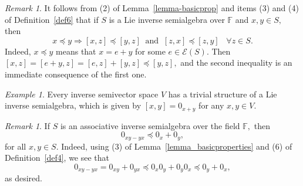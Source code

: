 \documentclass{amsart}
\newcommand{\E}{\mathcal{E}}
\newcommand{\0}{{\vartheta}}
\theoremstyle{definition}
\theoremstyle{remark}
\newtheorem{rem}[thm]{Remark}
\newtheorem{ex}[thm]{Example}
\numberwithin{equation}{section}
\newtheorem*{Theorem A}{\textbf{Theorem A}}
\newtheorem*{Corollary E}{\textbf{Corollary E}}
\newtheorem*{Corollary F}{\textbf{Corollary F}}
\newtheorem*{Theorem B}{\textbf{Theorem B}}
\newtheorem*{Theorem C}{\textbf{Theorem C}}
\newtheorem*{Theorem D}{\textbf{Theorem B}}
\newtheorem*{p a}{\textbf{Proof of  Theorem A}}
\newtheorem*{p b}{\textbf{Proof of Theorem B}}
\newtheorem*{p c}{\textbf{Proof of  Theorem C}}
\newtheorem*{p d}{\textbf{Proof of  Theorem D}}
\begin{document}
\begin{rem} It  follows from (2) of Lemma~\ref{lemma-basicprop} and items (3) and (4) of  Definition~\ref{def6} that if $S$ is a  Lie inverse semialgebra over  $\mathbb{F}$ and $x,y \in S,$  then 
\begin{equation}\label{eq:ineq}
x \preceq  y \Rightarrow [x,z] \preceq [y,z]\;\;\text{and}\;\;  [z,x] \preceq [z,y]\;\;\; \forall z\in S.
\end{equation} Indeed, $x \preceq y$ means that $x= e+ y$ for some $e\in \E (S).$ Then $[x,z] = [e+y,z] = [e,z]+
[y,z] \preceq [y,z],$ and the second inequality is an
immediate  consequence of the first one.
\end{rem}


\begin{ex}
Every inverse semivector space $V$ has a trivial structure of a Lie inverse semialgebra, which is given by $[x,y]=0_{x+y}$ for any $x,y\in V$. 
\end{ex}


\begin{rem}\label{rem:InvAssocLieInequality} 
    If  $S$ is an  associative inverse semialgebra over the field
      $\mathbb{F},$ then
\begin{equation}\label{eq:InvAssocLieInequality}   
    0_{xy -yx} \preceq 0_x + 0_y,
\end{equation}  for all $x,y \in S.$ Indeed, using  (3) of  Lemma~\ref{lemma_basicproperties} and  (6) of Definition~\ref{def4}, we see that 
$$ 0_{xy - yx} =  0_{xy} + 0_{yx}\preceq 0_{x}0_{y} + 0_{y}0_{x} \preceq 0_y + 0_x,$$ as desired.
\end{rem}
\end{document}
